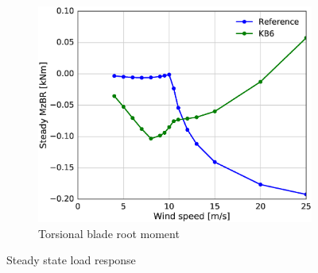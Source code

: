 \begin{figure}[tph]
\begin{subfigure}{\textwidth}
\centering
\includegraphics[width=0.50\linewidth]{figures/KB6_final/KB6_steady_MzBR_HS2.eps}
\caption{Torsional blade root moment}
\label{subfig:KB6_Mz}
\end{subfigure}
 
\caption{Steady state load response}
\label{fig:KB6_load_response}
\end{figure}

